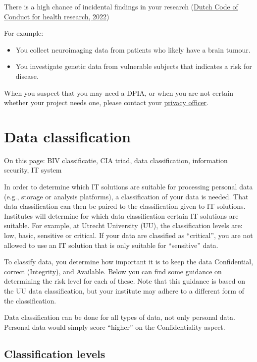 \documentclass[
]{book}
\providecommand{\tightlist}{%
  \setlength{\itemsep}{0pt}\setlength{\parskip}{0pt}}
\begin{document}
There is a high chance of incidental findings in your research
(\href{https://www.coreon.org/wp-content/uploads/2022/01/Gedragscode-Gezondheidsonderzoek-2022.pdf\#page=58}{Dutch Code of Conduct for health research, 2022})

For example:

\begin{itemize}
\tightlist
\item
  You collect neuroimaging data from patients who likely have a brain tumour.
\item
  You investigate genetic data from vulnerable subjects that indicates a risk
  for disease.
\end{itemize}

When you suspect that you may need a DPIA, or when you are not certain whether
your project needs one, please contact your \protect\hyperlink{support}{privacy officer}.

\hypertarget{data-classification}{%
\section{Data classification}\label{data-classification}}

On this page: BIV classificatie, CIA triad, data classification, information
security, IT system

In order to determine which IT solutions are suitable for processing personal
data (e.g., storage or analysis platforms), a classification of your data is
needed. That data classification can then be paired to the classification given
to IT solutions. Institutes will determine for which data classification certain
IT solutions are suitable. For example, at Utrecht University (UU), the
classification levels are: low, basic, sensitive or critical. If your data are
classified as ``critical'', you are not allowed to use an IT solution that is only
suitable for ``sensitive'' data.

To classify data, you determine how important it is to keep the data
Confidential, correct (Integrity), and Available. Below you can find some
guidance on determining the risk level for each of these. Note that this
guidance is based on the UU data classification, but your institute may adhere
to a different form of the classification.

Data classification can be done for all types of data, not only personal data.
Personal data would simply score ``higher'' on the Confidentiality aspect.

\hypertarget{classification-levels}{%
\subsection{Classification levels}\label{classification-levels}}
\end{document}
